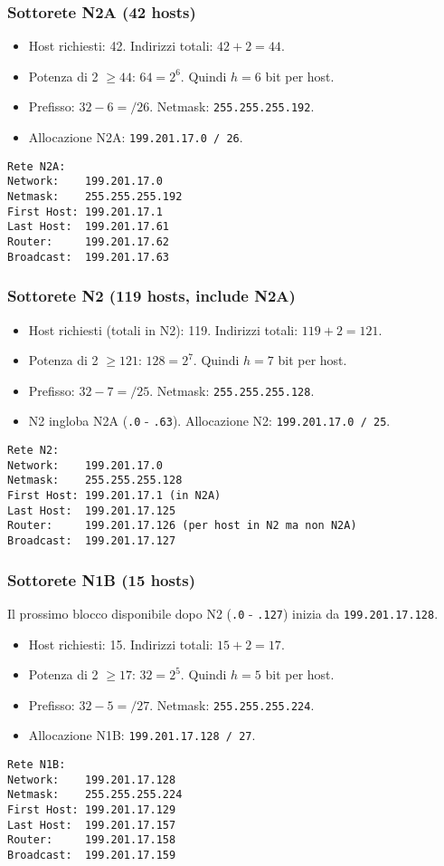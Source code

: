 \documentclass{article}
\begin{document}
\subsubsection{Sottorete N2A (42 hosts)}
\begin{itemize}
    \item Host richiesti: 42. Indirizzi totali: $42 + 2 = 44$.
    \item Potenza di 2 $\geq 44$: $64 = 2^6$. Quindi $h=6$ bit per host.
    \item Prefisso: $32 - 6 = /26$. Netmask: \texttt{255.255.255.192}.
    \item Allocazione N2A: \texttt{199.201.17.0 / 26}.
\end{itemize}
\begin{verbatim}
Rete N2A:
Network:    199.201.17.0
Netmask:    255.255.255.192
First Host: 199.201.17.1
Last Host:  199.201.17.61
Router:     199.201.17.62
Broadcast:  199.201.17.63
\end{verbatim}

\subsubsection{Sottorete N2 (119 hosts, include N2A)}
\begin{itemize}
    \item Host richiesti (totali in N2): 119. Indirizzi totali: $119 + 2 = 121$.
    \item Potenza di 2 $\geq 121$: $128 = 2^7$. Quindi $h=7$ bit per host.
    \item Prefisso: $32 - 7 = /25$. Netmask: \texttt{255.255.255.128}.
    \item N2 ingloba N2A (\texttt{.0} - \texttt{.63}). Allocazione N2: \texttt{199.201.17.0 / 25}.
\end{itemize}
\begin{verbatim}
Rete N2:
Network:    199.201.17.0
Netmask:    255.255.255.128
First Host: 199.201.17.1 (in N2A)
Last Host:  199.201.17.125
Router:     199.201.17.126 (per host in N2 ma non N2A)
Broadcast:  199.201.17.127
\end{verbatim}

\subsubsection{Sottorete N1B (15 hosts)}
Il prossimo blocco disponibile dopo N2 (\texttt{.0} - \texttt{.127}) inizia da \texttt{199.201.17.128}.
\begin{itemize}
    \item Host richiesti: 15. Indirizzi totali: $15 + 2 = 17$.
    \item Potenza di 2 $\geq 17$: $32 = 2^5$. Quindi $h=5$ bit per host.
    \item Prefisso: $32 - 5 = /27$. Netmask: \texttt{255.255.255.224}.
    \item Allocazione N1B: \texttt{199.201.17.128 / 27}.
\end{itemize}
\begin{verbatim}
Rete N1B:
Network:    199.201.17.128
Netmask:    255.255.255.224
First Host: 199.201.17.129
Last Host:  199.201.17.157
Router:     199.201.17.158
Broadcast:  199.201.17.159
\end{verbatim}
\end{document}
